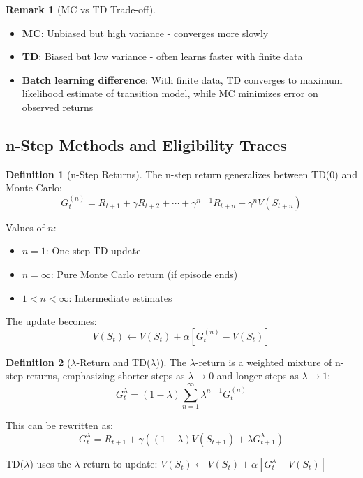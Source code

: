 \documentclass[12pt,a4paper]{article}
\theoremstyle{definition}
\newtheorem{definition}{Definition}[section]
\newtheorem{remark}{Remark}[section]
\begin{document}
\begin{remark}[MC vs TD Trade-off]
\begin{itemize}
    \item \textbf{MC}: Unbiased but high variance - converges more slowly
    \item \textbf{TD}: Biased but low variance - often learns faster with finite data
    \item \textbf{Batch learning difference}: With finite data, TD converges to maximum likelihood estimate of transition model, while MC minimizes error on observed returns
\end{itemize}
\end{remark}

\subsection{n-Step Methods and Eligibility Traces}

\begin{definition}[n-Step Returns]
The n-step return generalizes between TD(0) and Monte Carlo:
\[
G_t^{(n)} = R_{t+1} + \gamma R_{t+2} + \cdots + \gamma^{n-1} R_{t+n} + \gamma^n V(S_{t+n})
\]

Values of $n$:
\begin{itemize}
    \item $n = 1$: One-step TD update
    \item $n = \infty$: Pure Monte Carlo return (if episode ends)
    \item $1 < n < \infty$: Intermediate estimates
\end{itemize}

The update becomes:
\[
V(S_t) \leftarrow V(S_t) + \alpha [G_t^{(n)} - V(S_t)]
\]
\end{definition}

\begin{definition}[$\lambda$-Return and TD($\lambda$)]
The $\lambda$-return is a weighted mixture of n-step returns, emphasizing shorter steps as $\lambda \to 0$ and longer steps as $\lambda \to 1$:
\[
G_t^\lambda = (1-\lambda) \sum_{n=1}^\infty \lambda^{n-1} G_t^{(n)}
\]

This can be rewritten as:
\[
G_t^\lambda = R_{t+1} + \gamma((1-\lambda) V(S_{t+1}) + \lambda G_{t+1}^\lambda)
\]

TD($\lambda$) uses the $\lambda$-return to update: $V(S_t) \leftarrow V(S_t) + \alpha[G_t^\lambda - V(S_t)]$
\end{definition}
\end{document}
